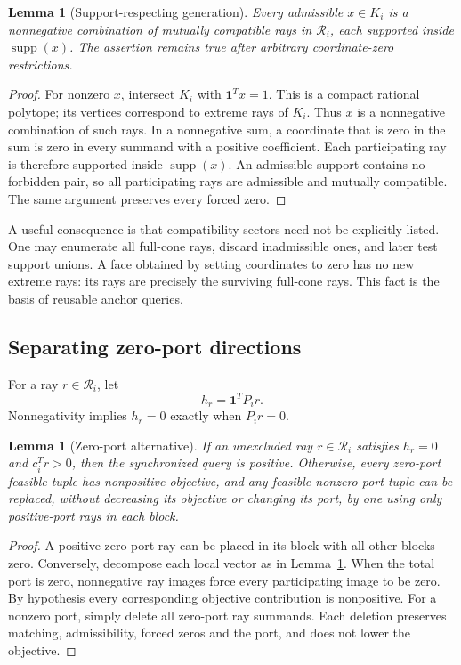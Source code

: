 \documentclass[11pt,a4paper]{article}
\newtheorem{lemma}[theorem]{Lemma}
\theoremstyle{definition}
\theoremstyle{remark}
\newcommand{\supp}{\operatorname{supp}}\newcommand{\rank}{\operatorname{rank}}
\newcommand{\one}{\mathbf1}\newcommand{\code}[1]{\texttt{\detokenize{#1}}}
\begin{document}
\begin{lemma}[Support-respecting generation]
\label{lem:decomp}
Every admissible $x\in K_i$ is a nonnegative combination of mutually compatible rays in $\mathcal R_i$, each supported inside $\supp(x)$. The assertion remains true after arbitrary coordinate-zero restrictions.
\end{lemma}
\begin{proof}
For nonzero $x$, intersect $K_i$ with $\one^T x=1$. This is a compact rational polytope; its vertices correspond to extreme rays of $K_i$. Thus $x$ is a nonnegative combination of such rays. In a nonnegative sum, a coordinate that is zero in the sum is zero in every summand with a positive coefficient. Each participating ray is therefore supported inside $\supp(x)$. An admissible support contains no forbidden pair, so all participating rays are admissible and mutually compatible. The same argument preserves every forced zero.
\end{proof}

A useful consequence is that compatibility sectors need not be explicitly listed. One may enumerate all full-cone rays, discard inadmissible ones, and later test support unions. A face obtained by setting coordinates to zero has no new extreme rays: its rays are precisely the surviving full-cone rays. This fact is the basis of reusable anchor queries.

\subsection{Separating zero-port directions}
For a ray $r\in\mathcal R_i$, let
\[
 h_r=\one^TP_i r.
\]
Nonnegativity implies $h_r=0$ exactly when $P_i r=0$.

\begin{lemma}[Zero-port alternative]
\label{lem:zero}
If an unexcluded ray $r\in\mathcal R_i$ satisfies $h_r=0$ and $c_i^Tr>0$, then the synchronized query is positive. Otherwise, every zero-port feasible tuple has nonpositive objective, and any feasible nonzero-port tuple can be replaced, without decreasing its objective or changing its port, by one using only positive-port rays in each block.
\end{lemma}
\begin{proof}
A positive zero-port ray can be placed in its block with all other blocks zero. Conversely, decompose each local vector as in Lemma~\ref{lem:decomp}. When the total port is zero, nonnegative ray images force every participating image to be zero. By hypothesis every corresponding objective contribution is nonpositive. For a nonzero port, simply delete all zero-port ray summands. Each deletion preserves matching, admissibility, forced zeros and the port, and does not lower the objective.
\end{proof}
\end{document}
